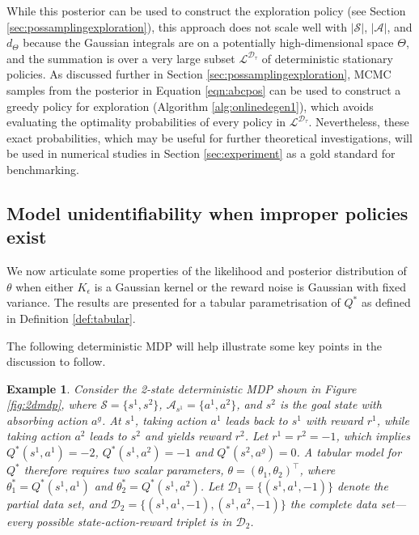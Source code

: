 \documentclass{amsart}
\newtheorem{example}{Example}
\begin{document}
While this posterior can be used to construct the exploration policy (see Section \ref{sec:possamplingexploration}), this approach does not scale well with $|\mathcal{S}|$, $|\mathcal{A}|$, and $d_{\Theta}$ because the Gaussian integrals are on a potentially high-dimensional space $\Theta$, and the summation is over a very large subset $\mathcal{L}^{\mathcal{D}_\tau}$ of deterministic stationary policies. As discussed further in Section \ref{sec:possamplingexploration}, MCMC samples from the posterior in Equation \ref{eqn:abcpos} can be used to construct a greedy policy for exploration (Algorithm \ref{alg:onlinedegen1}), which avoids evaluating the optimality probabilities of every policy in $\mathcal{L}^{\mathcal{D}_\tau}$. Nevertheless, these exact probabilities, which may be useful for further theoretical investigations, will be used in numerical studies in Section \ref{sec:experiment} as a gold standard for benchmarking.


\subsection{Model unidentifiability when improper policies exist}\label{sec:unidentifiability_improper}
We now articulate some properties of the likelihood and posterior distribution of $\theta$ when either $K_\epsilon$ is a Gaussian kernel or the reward noise is Gaussian with fixed variance. The results are presented for a tabular parametrisation of $Q^*$ as defined in Definition \ref{def:tabular}.

The following deterministic MDP will help illustrate some key points in the discussion to follow.
\begin{example}
    Consider the 2-state deterministic MDP shown in Figure \ref{fig:2dmdp}, where $\mathcal{S}=\{s^1,s^2\}$, $\mathcal{A}_{s^1}=\{a^1,a^2\}$, and $s^2$ is the goal state with absorbing action $a^g$. At $s^1$, taking action $a^1$ leads back to $s^1$ with reward $r^1$, while taking action $a^2$ leads to $s^2$ and yields reward $r^2$. Let $r^1=r^2=-1$, which  implies $Q^*(s^1,a^1)=-2$, $Q^*(s^1,a^2)=-1$ and $Q^*(s^2,a^g)=0$. A tabular model for $Q^*$ therefore requires two scalar parameters, $\theta=(\theta_1,\theta_2)^\top$, where $\theta_1^\ast = Q^*(s^1,a^1)$ and  $\theta_2^\ast = Q^*(s^1,a^2)$. Let $\mathcal{D}_1 = \{(s^1,a^1,-1)\}$ denote the partial data set,  and $\mathcal{D}_2 = \{(s^1,a^1,-1),(s^1,a^2,-1)\}$ the {\it complete} data set---every possible state-action-reward triplet is in $\mathcal{D}_2 $.
    \label{ex:2dmdp}
\end{example}
\end{document}
